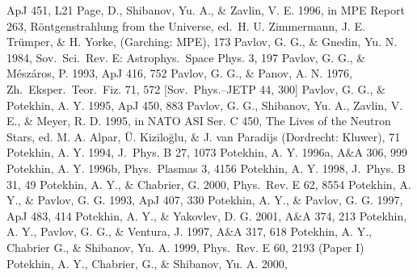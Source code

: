 \documentclass{emulateapj}
\begin{document}
\begin{thebibliography}{}
ApJ 451, L21
%
Page, D., Shibanov, Yu. A., \& Zavlin, V. E. 1996,
in MPE Report 263,
R\"ontgenstrahlung from the Universe,
ed.\ H. U. Zimmermann, J. E. Tr\"umper, \& H. Yorke,
       (Garching: MPE), 173 
%
Pavlov, G. G., \& Gnedin, Yu. N. 1984,
Sov.\ Sci.\ Rev. E: Astrophys.\ Space Phys. 3, 197
%
Pavlov, G. G., \& M\'esz\'aros, P. 1993,
ApJ 416, 752
%
Pavlov, G. G., \& Panov, A. N. 1976,
Zh.\ Eksper.\ Teor.\ Fiz. 71, 572
[Sov.\ Phys.--JETP 44, 300]
%
Pavlov, G. G., \& Potekhin, A. Y. 1995,
ApJ 450, 883
%
%
Pavlov, G. G., Shibanov, Yu. A., Zavlin, V. E., \& Meyer, R. D. 1995,
in NATO ASI Ser. C 450,
The Lives of the Neutron Stars,
ed. M. A. Alpar, \"U. Kizilo\u{g}lu, \& J. van Paradijs
       (Dordrecht: Kluwer), 71
%
%
Potekhin, A. Y. 1994,
J.\ Phys. B 27, 1073
%
Potekhin, A. Y. 1996a,
A\&A 306, 999          %
%
Potekhin, A. Y. 1996b,
Phys.\ Plasmas 3, 4156
%
Potekhin, A. Y. 1998,
J.\ Phys. B 31, 49
%
Potekhin, A. Y., \& Chabrier, G. 2000,
Phys.\ Rev. E 62, 8554 
%
Potekhin, A. Y., \& Pavlov, G. G. 1993,
ApJ 407, 330
%
Potekhin, A. Y., \& Pavlov, G. G. 1997,
ApJ 483, 414
%
 Potekhin, A. Y., \& Yakovlev, D. G. 2001,
 A\&A 374, 213
%
Potekhin, A. Y., Pavlov, G. G., \& Ventura, J. 1997,
A\&A 317, 618
%
Potekhin, A. Y., Chabrier G., \& Shibanov, Yu. A. 1999,
Phys.\ Rev. E 60, 2193 (Paper I)
%
Potekhin, A. Y., Chabrier, G., \& Shibanov, Yu. A. 2000,

\end{thebibliography}
\end{document}
